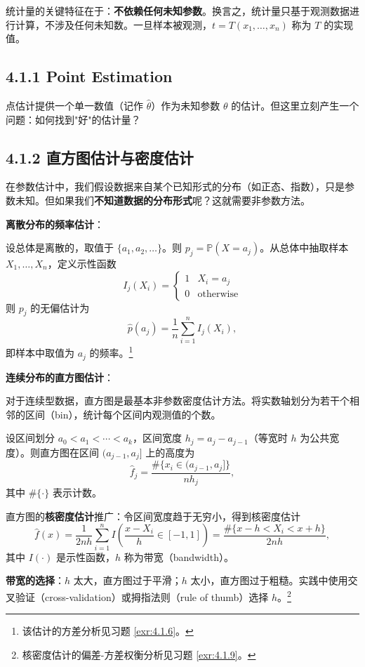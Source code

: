 统计量的关键特征在于：\textbf{不依赖任何未知参数}。换言之，统计量只基于观测数据进行计算，不涉及任何未知数。一旦样本被观测，$t = T(x_1, \ldots, x_n)$ 称为 $T$ 的实现值。

\subsection{4.1.1 Point Estimation}\label{sec:4.1.1}

点估计提供一个单一数值（记作 $\widehat{\theta}$）作为未知参数 $\theta$ 的估计。但这里立刻产生一个问题：如何找到"好"的估计量？

\subsection{4.1.2 直方图估计与密度估计}\label{sec:4.1.2}

在参数估计中，我们假设数据来自某个已知形式的分布（如正态、指数），只是参数未知。但如果我们\textbf{不知道数据的分布形式}呢？这就需要非参数方法。

\textbf{离散分布的频率估计}：

设总体是离散的，取值于 $\{a_1, a_2, \ldots\}$。则 $p_j = \mathbb{P}(X = a_j)$。从总体中抽取样本 $X_1, \ldots, X_n$，定义示性函数
\[
I_j(X_i) =
\begin{cases}
1 & X_i = a_j \\
0 & \text{otherwise}
\end{cases}
\]
则 $p_j$ 的无偏估计为
\[
\widehat{p}(a_j) = \frac{1}{n}\sum_{i=1}^n I_j(X_i),
\label{eq:frequency-estimator}
\]
即样本中取值为 $a_j$ 的频率。\footnote{该估计的方差分析见习题 \ref{exr:4.1.6}。}

\textbf{连续分布的直方图估计}：

对于连续型数据，直方图是最基本非参数密度估计方法。将实数轴划分为若干个相邻的区间（bin），统计每个区间内观测值的个数。

设区间划分 $a_0 < a_1 < \cdots < a_k$，区间宽度 $h_j = a_j - a_{j-1}$（等宽时 $h$ 为公共宽度）。则直方图在区间 $(a_{j-1}, a_j]$ 上的高度为
\[
\widehat{f}_j = \frac{\#\{x_i \in (a_{j-1}, a_j]\}}{n h_j},
\label{eq:histogram-estimator}
\]
其中 $\#\{\cdot\}$ 表示计数。

直方图的\textbf{核密度估计}推广：令区间宽度趋于无穷小，得到核密度估计
\[
\widehat{f}(x) = \frac{1}{2nh}\sum_{i=1}^n I\!\left(\frac{x - X_i}{h} \in [-1,1]\right)
= \frac{\#\{x-h < X_i < x+h\}}{2nh},
\label{eq:kernel-density}
\]
其中 $I(\cdot)$ 是示性函数，$h$ 称为带宽（bandwidth）。

\textbf{带宽的选择}：$h$ 太大，直方图过于平滑；$h$ 太小，直方图过于粗糙。实践中使用交叉验证（cross-validation）或拇指法则（rule of thumb）选择 $h$。\footnote{核密度估计的偏差-方差权衡分析见习题 \ref{exr:4.1.9}。}

